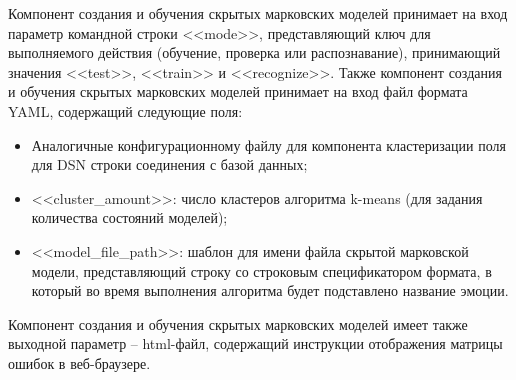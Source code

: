 Компонент создания и обучения скрытых марковских моделей принимает на вход параметр командной строки <<mode>>, представляющий ключ для выполняемого действия (обучение, проверка или распознавание), принимающий значения <<test>>, <<train>> и <<recognize>>. Также компонент создания и обучения скрытых марковских моделей принимает на вход файл формата YAML, содержащий следующие поля:
\begin{itemize}
	\item Аналогичные конфигурационному файлу для компонента кластеризации поля для DSN строки соединения с базой данных;
	\item <<cluster\_amount>>: число кластеров алгоритма k-means (для задания количества состояний моделей);
	\item <<model\_file\_path>>: шаблон для имени файла скрытой марковской модели, представляющий строку со строковым спецификатором формата, в который во время выполнения алгоритма будет подставлено название эмоции.
\end{itemize}
Компонент создания и обучения скрытых марковских моделей имеет также выходной параметр -- html-файл, содержащий инструкции отображения матрицы ошибок в веб-браузере.

